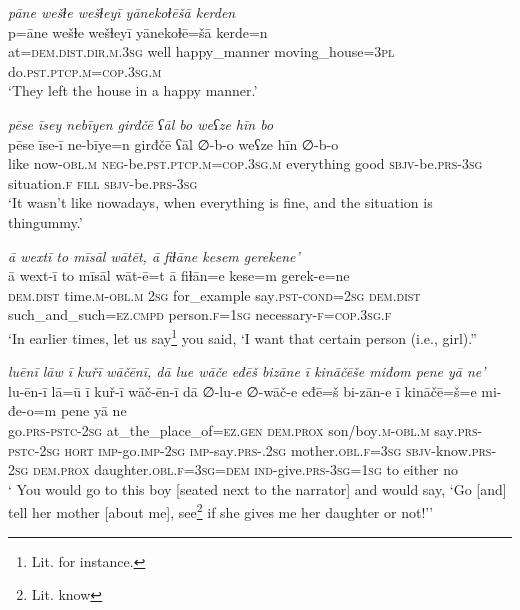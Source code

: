 \ea \label{ŽE.71}
\textit{pāne wešɫe wešɫeyī yānekoɫēšā kerden} \\ 
\gll p=āne wešɫe wešɫeyī yānekoɫē=šā kerde=n \\ 
 at=\textsc{dem.dist}\textsc{.dir}\textsc{.m}\textsc{.3sg} well happy\_manner moving\_house\textsc{=3pl} do\textsc{.pst}\textsc{.ptcp}\textsc{.m}\textsc{=cop}\textsc{.3sg}\textsc{.m} \\ 
\glt `They left the house in a happy manner.'
\z 
 
\ea \label{ŽE.72}
\textit{pēse īsey nebīyen girđčē ʕāl bo weʕze hīn bo} \\ 
\gll pēse īse-ī ne-bīye=n girđčē ʕāl ∅-b-o weʕze hīn ∅-b-o \\ 
  like now\textsc{-obl}\textsc{.m} \textsc{neg-}be\textsc{.pst}\textsc{.ptcp}\textsc{.m}\textsc{=cop}\textsc{.3sg}\textsc{.m} everything good \textsc{sbjv-}be\textsc{.prs}\textsc{-3sg} situation\textsc{.f} \textsc{fill} \textsc{sbjv-}be\textsc{.prs}\textsc{-3sg} \\ 
\glt `It wasn’t like nowadays, when everything is fine, and the situation is thingummy.'
\z 
 
\ea \label{ŽE.73}
\textit{ā wextī to mīsāl wātēt, ā fiɫāne kesem gerekene’} \\ 
\gll ā wext-ī to mīsāl wāt-ē=t ā fiɫān=e kese=m gerek-e=ne \\ 
 \textsc{dem.dist} time\textsc{.m}\textsc{-obl}\textsc{.m} \textsc{2sg} for\_example say\textsc{.pst}\textsc{-cond}\textsc{=\textsc{2sg}} \textsc{dem.dist} such\_and\_such\textsc{=ez}\textsc{.cmpd} person\textsc{.f}\textsc{=\textsc{1sg}} necessary\textsc{-f}\textsc{=cop}\textsc{.3sg}\textsc{.f} \\ 
\glt `In earlier times, let us say\footnote{Lit. for instance.} you said, ‘I want that certain person (i.e., girl).''
\z 
 
\ea \label{ŽE.74}
\textit{luēnī lāw ī kuřī wāčēnī, dā lue wāče eđēš bizāne ī kināčēše miđom pene yā ne’} \\ 
\gll lu-ēn-ī lā=ū ī kuř-ī wāč-ēn-ī dā ∅-lu-e ∅-wāč-e eđē=š bi-zān-e ī kināčē=š=e mi-đe-o=m pene yā ne \\ 
 go\textsc{.prs}\textsc{-pstc}-\textsc{2sg} at\_the\_place\_of\textsc{\textsc{=ez.gen}} \textsc{dem.prox} son/boy\textsc{.m}\textsc{-obl}\textsc{.m} say\textsc{.prs}\textsc{-pstc}-\textsc{2sg} \textsc{hort} \textsc{imp-}go.\textsc{imp-}\textsc{2sg} \textsc{imp-}say\textsc{.prs-}.\textsc{2sg} mother\textsc{.obl}\textsc{.f}\textsc{=3sg} \textsc{sbjv-}know\textsc{.prs}-\textsc{2sg} \textsc{dem.prox} daughter\textsc{.obl}\textsc{.f}\textsc{=3sg}\textsc{=dem} \textsc{ind-}give\textsc{.prs}\textsc{-3sg}\textsc{=\textsc{1sg}} to either no \\ 
\glt ` You would go to this boy [seated next to the narrator] and would say, ‘Go [and] tell her mother [about me], see\footnote{Lit. know} if she gives me her daughter or not!’'
\z 
 
